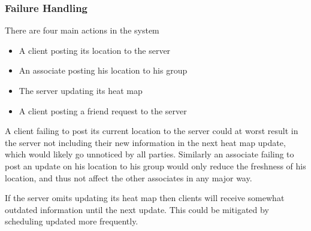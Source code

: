 

\subsubsection{Failure Handling}




    
There are four main actions in the system

\begin{itemize}
    \item A client posting its location to the server
    \item An associate posting his location to his group
    \item The server updating its heat map
    \item A client posting a friend request to the server
\end{itemize}

A client failing to post its current location to the server could at worst result in the server not including their new information in the next heat map update, which would likely go unnoticed by all parties. Similarly an associate failing to post an update on his location to his group would only reduce the freshness of his location, and thus not affect the other associates in any major way.

If the server omits updating its heat map then clients will receive somewhat outdated information until the next update. This could be mitigated by scheduling updated more frequently. 


